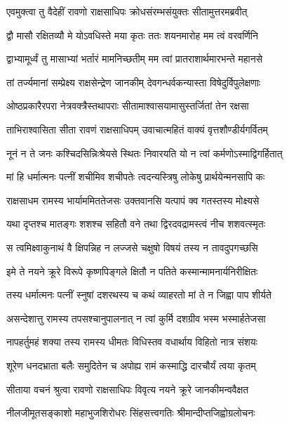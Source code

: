 \twolineshloka
{एवमुक्त्वा तु वैदेहीं रावणो राक्षसाधिपः}
{क्रोधसंरम्भसंयुक्तः सीतामुत्तरमब्रवीत्} %

\twolineshloka
{द्वौ मासौ रक्षितव्यौ मे योऽवधिस्ते मया कृतः}
{ततः शयनमारोह मम त्वं वरवर्णिनि} %

\twolineshloka
{द्वाभ्यामूर्ध्वं तु मासाभ्यां भर्तारं मामनिच्छतीम्}
{मम त्वां प्रातराशार्थमारभन्ते महानसे} %

\twolineshloka
{तां तर्ज्यमानां सम्प्रेक्ष्य राक्षसेन्द्रेण जानकीम्}
{देवगन्धर्वकन्यास्ता विषेदुर्विपुलेक्षणाः} %

\twolineshloka
{ओष्ठप्रकारैरपरा नेत्रवक्त्रैस्तथापराः}
{सीतामाश्वासयामासुस्तर्जितां तेन रक्षसा} %

\twolineshloka
{ताभिराश्वासिता सीता रावणं राक्षसाधिपम्}
{उवाचात्महितं वाक्यं वृत्तशौण्डीर्यगर्वितम्} %

\twolineshloka
{नूनं न ते जनः कश्चिदसिन्निःश्रेयसे स्थितः}
{निवारयति यो न त्वां कर्मणोऽस्माद्विगर्हितात्} %

\twolineshloka
{मां हि धर्मात्मनः पत्नीं शचीमिव शचीपतेः}
{त्वदन्यस्त्रिषु लोकेषु प्रार्थयेन्मनसापि कः} %

\twolineshloka
{राक्षसाधम रामस्य भार्याममिततेजसः}
{उक्तवानसि यत्पापं क्व गतस्तस्य मोक्ष्यसे} %

\twolineshloka
{यथा दृप्तश्च मातङ्गः शशश्च सहितौ वने}
{तथा द्विरदवद्रामस्त्वं नीच शशवत्स्मृतः} %

\twolineshloka
{स त्वमिक्ष्वाकुनाथं वै क्षिपन्निह न लज्जसे}
{चक्षुषो विषयं तस्य न तावदुपगच्छसि} %

\twolineshloka
{इमे ते नयने क्रूरे विरूपे कृष्णपिङ्गले}
{क्षितौ न पतिते कस्मान्मामनार्यनिरीक्षितः} %

\twolineshloka
{तस्य धर्मात्मनः पत्नीं स्नुषां दशरथस्य च}
{कथं व्याहरतो मां ते न जिह्वा पाप शीर्यते} %

\twolineshloka
{असन्देशात्तु रामस्य तपसश्चानुपालनात्}
{न त्वां कुर्मि दशग्रीव भस्म भस्मार्हतेजसा} %

\twolineshloka
{नापहर्तुमहं शक्या तस्य रामस्य धीमतः}
{विधिस्तव वधार्थाय विहितो नात्र संशयः} %

\twolineshloka
{शूरेण धनदभ्राता बलैः समुदितेन च}
{अपोह्य रामं कस्माद्धि दारचौर्यं त्वया कृतम्} %

\twolineshloka
{सीताया वचनं श्रुत्वा रावणो राक्षसाधिपः}
{विवृत्य नयने क्रूरे जानकीमन्ववैक्षत} %

\twolineshloka
{नीलजीमूतसङ्काशो महाभुजशिरोधरः}
{सिंहसत्त्वगतिः श्रीमान्दीप्तजिह्वोग्रलोचनः} %

